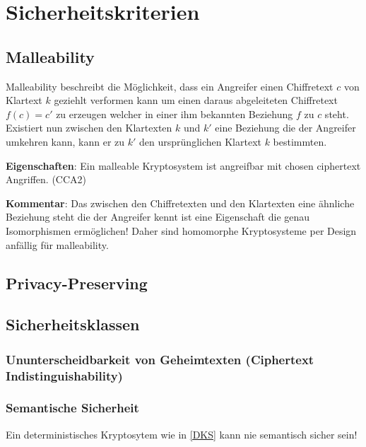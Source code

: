 \chapter{Sicherheitskriterien}
\label{Sicherheitskriterien}
\section{Malleability}
Malleability beschreibt die Möglichkeit, dass ein Angreifer einen Chiffretext $c$ von Klartext $k$ geziehlt verformen kann um einen daraus abgeleiteten Chiffretext $f(c)=c'$ zu erzeugen welcher in einer ihm bekannten Beziehung $f$ zu $c$ steht. Existiert nun zwischen den Klartexten $k$ und $k'$ eine Beziehung die der Angreifer umkehren kann, kann er zu $k'$ den ursprünglichen Klartext $k$ bestimmten. \cite[p. 292]{smart2003}

\textbf{Eigenschaften}: Ein malleable Kryptosystem ist angreifbar mit chosen ciphertext Angriffen. (CCA2)

\textbf{Kommentar}: Das zwischen den Chiffretexten und den Klartexten eine ähnliche Beziehung steht die der Angreifer kennt ist eine Eigenschaft die genau Isomorphismen ermöglichen! Daher sind homomorphe Kryptosysteme per Design anfällig für malleability.

\section{Privacy-Preserving}

\section{Sicherheitsklassen}
\subsection {Ununterscheidbarkeit von Geheimtexten (Ciphertext Indistinguishability)}
\subsection{Semantische Sicherheit}
Ein deterministisches Kryptosytem wie in \ref{DKS} kann nie semantisch sicher sein!